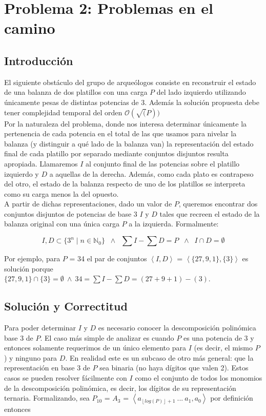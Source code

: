 \newpage
\section{Problema 2: Problemas en el camino}

\subsection{Introducción}
	El siguiente obstáculo del grupo de arqueólogos consiste en reconstruir el estado de una balanza de dos platillos con una carga $P$ del lado izquierdo utilizando únicamente pesas de distintas potencias de 3. Además la solución propuesta debe tener complejidad temporal del orden $\mathcal{O}(\sqrt(P))$
	\\

	Por la naturaleza del problema, donde nos interesa determinar únicamente la pertenencia de cada potencia en el total de las que usamos para nivelar la balanza (y distinguir a qué lado de la balanza van) la representación del estado final de cada platillo por separado mediante conjuntos disjuntos resulta apropiada. Llamaremos $I$ al conjunto final de las potencias sobre el platillo izquierdo y $D$ a aquellas de la derecha. Además, como cada plato es contrapeso del otro, el estado de la balanza respecto de uno de los platillos se interpreta como su carga menos la del opuesto.
	\\

	A partir de dichas representaciones, dado un valor de $P$, queremos encontrar dos conjuntos disjuntos de potencias de base 3 $I$ y $D$ tales que recreen el estado de la balanza original con una única carga $P$ a la izquierda. Formalmente:

$$
    I,D \subset \{3^n \;|\; n \in \mathbb{N}_0 \} \;\; \land \;\;
    \sum I - \sum D = P \;\; \land \;\;
    I \cap D = \emptyset
$$

	Por ejemplo, para $P$ = 34 el par de conjuntos $\left \langle I,D  \right \rangle$ = $\left \langle \{27,9,1\},\{3\}  \right \rangle$ es solución porque \\
	$\{27,9,1\} \cap \{3\} = \emptyset \ \wedge \ 34 = \sum I - \sum D = (27+9+1)-(3)$.
	\\



\subsection{Solución y Correctitud}
	Para poder determinar $I$ y $D$ es necesario conocer la descomposición polinómica base 3 de $P$. El caso más simple de analizar es cuando $P$ es una potencia de 3 y entonces solamente requerimos de un único elemento para $I$ (es decir, el mismo $P$) y ninguno para $D$. En realidad este es un subcaso de otro más general: que la representación en base 3 de $P$ sea binaria (no haya dígitos que valen 2). Estos casos se pueden resolver fácilmente con $I$ como el conjunto de todos los monomios de la descomposición polinómica, es decir, los dígitos de su representación ternaria. Formalizando, sea $P_{10}$ = $A_3$ = $\left \langle a_{ \left \lfloor{log(P)}\right \rfloor + 1 } \ ... \ a_1, a_0  \right \rangle$ por definición entonces \\

